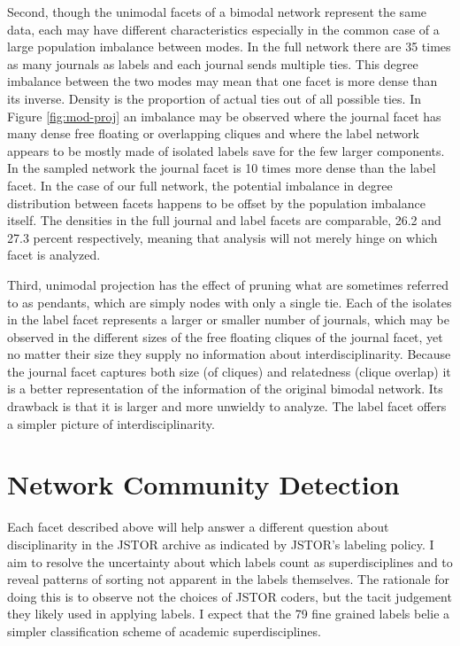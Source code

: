 \documentclass[]{book}
\theoremstyle{definition}
\theoremstyle{definition}
\theoremstyle{definition}
\theoremstyle{remark}
\begin{document}
Second, though the unimodal facets of a bimodal network represent the
same data, each may have different characteristics especially in the
common case of a large population imbalance between modes. In the full
network there are 35 times as many journals as labels and each journal
sends multiple ties. This degree imbalance between the two modes may
mean that one facet is more dense than its inverse. Density is the
proportion of actual ties out of all possible ties. In Figure
\ref{fig:mod-proj} an imbalance may be observed where the journal facet
has many dense free floating or overlapping cliques and where the label
network appears to be mostly made of isolated labels save for the few
larger components. In the sampled network the journal facet is 10 times
more dense than the label facet. In the case of our full network, the
potential imbalance in degree distribution between facets happens to be
offset by the population imbalance itself. The densities in the full
journal and label facets are comparable, 26.2 and 27.3 percent
respectively, meaning that analysis will not merely hinge on which facet
is analyzed.

Third, unimodal projection has the effect of pruning what are sometimes
referred to as pendants, which are simply nodes with only a single tie.
Each of the isolates in the label facet represents a larger or smaller
number of journals, which may be observed in the different sizes of the
free floating cliques of the journal facet, yet no matter their size
they supply no information about interdisciplinarity. Because the
journal facet captures both size (of cliques) and relatedness (clique
overlap) it is a better representation of the information of the
original bimodal network. Its drawback is that it is larger and more
unwieldy to analyze. The label facet offers a simpler picture of
interdisciplinarity.

\hypertarget{ncd}{%
\section{Network Community Detection}\label{ncd}}

Each facet described above will help answer a different question about
disciplinarity in the JSTOR archive as indicated by JSTOR's labeling
policy. I aim to resolve the uncertainty about which labels count as
superdisciplines and to reveal patterns of sorting not apparent in the
labels themselves. The rationale for doing this is to observe not the
choices of JSTOR coders, but the tacit judgement they likely used in
applying labels. I expect that the 79 fine grained labels belie a
simpler classification scheme of academic superdisciplines.
\end{document}
